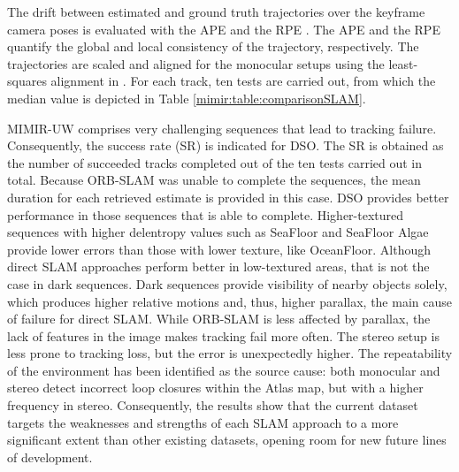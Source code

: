 The drift between estimated and ground truth trajectories over the keyframe camera poses is evaluated with the \ac{APE} and the \ac{RPE} \cite{sturm2012tumrgbd}. The \ac{APE} and the  \ac{RPE} quantify the global and local consistency of the trajectory, respectively. The trajectories are scaled and aligned for the monocular setups using the least-squares alignment in \cite{grupp2017evo}. For each track, ten tests are carried out, from which the median value is depicted in Table \ref{mimir:table:comparisonSLAM}. 

MIMIR-UW comprises very challenging sequences that lead to tracking failure. Consequently, the success rate (SR) is indicated for DSO. The SR is obtained as the number of succeeded tracks completed out of the ten tests carried out in total.
Because ORB-SLAM was unable to complete the sequences, the mean duration for each retrieved estimate is provided in this case. 
DSO provides better performance in those sequences that is able to complete.
Higher-textured sequences with higher delentropy values such as SeaFloor and SeaFloor Algae provide lower errors than those with lower texture, like OceanFloor.
Although direct SLAM approaches perform better in low-textured areas, that is not the case in dark sequences. Dark sequences provide visibility of nearby objects solely, which produces higher relative motions and, thus, higher parallax, the main cause of failure for direct SLAM. While ORB-SLAM is less affected by parallax, the lack of features in the image makes tracking fail more often. The stereo setup is less prone to tracking loss, but the error is unexpectedly higher. The repeatability of the environment has been identified as the source cause: both monocular and stereo detect incorrect loop closures within the Atlas map, but with a higher frequency in stereo. 
Consequently, the results show that the current dataset targets the weaknesses and strengths of each SLAM approach to a more significant extent than other existing datasets, opening room for new future lines of development.

